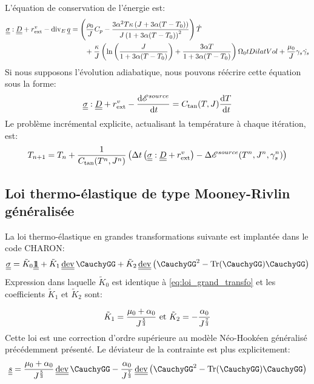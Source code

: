 \documentclass[10pt]{book}
\begin{document}
\begin{appendices}
L'équation de conservation de l'énergie est:
$$\begin{aligned}
\SC:\TD+\PCaloVol-\div_{E}\CourantChal&=\left(\dfrac{\rho_{0}}{\J}C_{p}-\dfrac{3\alpha^{2} T\BulkModulus\left(\J+3\alpha(T-T_{0})\right)}{\J\left(1+3\alpha(T-T_{0})\right)^{2}}\right)\dot{T}\\
&\qquad +\dfrac{\BulkModulus}{\J}\left(\ln\left(\dfrac{\J}{1+3\alpha(T-T_{0})}\right)+\dfrac{3\alpha T}{1+3\alpha(T-T_{0})}\right)\Configuration_{0}tDilatVol+\dfrac{\mu_{0}}{\J}\Glisss\dot{\Glisss}
\end{aligned}$$
Si nous supposons l'évolution adiabatique, nous pouvons réécrire cette équation sous la forme:
$$\underline{\underline{\sigma}}:\underline{\underline{D}}+r^{v}_{\text{ext}}-\dfrac{\mathrm{d}\mathscr{E}^{source}}{\,\mathrm{d}t}=C_{\tan}(T,J)\dfrac{\mathrm{d} T}{\,\mathrm{d}t}$$
Le problème incrémental explicite, actualisant la température à chaque itération, est:
$$T_{n+1}=T_{n}+\dfrac{1}{C_{\tan}(T^{n},J^{n})}\left(\Delta t\left(\underline{\underline{\sigma}}:\underline{\underline{D}}+r^{v}_{\text{ext}}\right)-\Delta\mathscr{E}^{source}(T^{n}, J^{n}, \gamma_{s}^{n})\right)$$
\subsection{Loi thermo-élastique de type Mooney-Rivlin généralisée}
La loi thermo-élastique en grandes transformations suivante est implantée dans le code CHARON:
\begin{equation}
\SC=\tilde{K}_{0}\TU+\tilde{K}_{1}\dev\CauchyGG+\tilde{K}_{2}\dev\left(\CauchyGG^{2}-\tr(\CauchyGG)\CauchyGG\right)
\label{eq:loi_grand_transfo_MR}
\end{equation}
Expression dans laquelle $\tilde{K}_{0}$ est identique à \eqref{eq:loi_grand_transfo} et les coefficients $\tilde{K}_{1}$ et $\tilde{K}_{2}$ sont:

$$\tilde{K}_{1}=\dfrac{\mu_{0}+\alpha_{0}}{J^{\frac{5}{3}}} \text{ et } \tilde{K}_{2}=-\dfrac{\alpha_{0}}{J^\frac{7}{3}}$$
Cette loi est une correction d'ordre supérieure au modèle Néo-Hookéen généralisé précédemment présenté. Le déviateur de la contrainte est plus explicitement:
\begin{equation}
\devia=\dfrac{\mu_{0}+\alpha_{0}}{\J^{\frac{5}{3}}}\dev\CauchyGG-\dfrac{\alpha_{0}}{\J^\frac{7}{3}}\dev\left(\CauchyGG^{2}-\tr(\CauchyGG)\CauchyGG\right)
\label{eq:devia_MR}
\end{equation}


\end{appendices}
\end{document}

